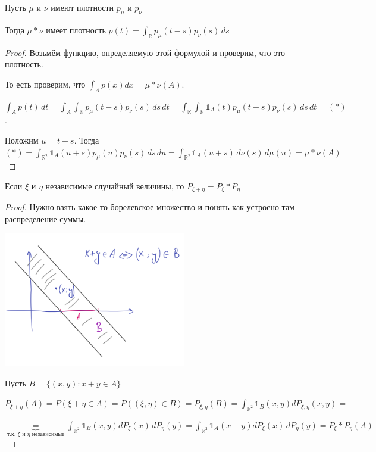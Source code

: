 \begin{theorem}
    Пусть $\mu$ и $\nu$ имеют плотности $p_{\mu}$ и $p_{\nu}$

    Тогда $\mu * \nu$ имеет плотность $p(t) = \int_{\mathbb{R}} p_{\mu} (t - s) p_{\nu} (s) \, ds$
\end{theorem}

\begin{proof}
    Возьмём функцию, определяемую этой формулой и проверим, что это плотность.

    То есть проверим, что $\int_{A} p(x) dx = \mu * \nu (A)$.

    $\int_A p(t) \, dt = \int_A \int_{\mathbb{R}} p_{\mu} (t - s) p_{\nu} (s) \, ds \, dt = \int_{\mathbb{R}}
    \int_{\mathbb{R}} \mathds{1}_A (t) p_{\mu} (t - s) p_{\nu} (s) \, ds \, dt = (*)$.

    Положим $u = t - s$. Тогда $(*) = \int_{\mathbb{R}^2} \mathds{1}_{A} (u + s) p_{\mu} (u) p_{\nu} (s) \, ds \, du =
    \int_{\mathbb{R}^2} \mathds{1}_A (u + s) \, d\nu (s) \, d \mu (u) = \mu * \nu (A)$
\end{proof}

\begin{theorem}
    Если $\xi$ и $\eta$ независимые случайный величины, то $P_{\xi + \eta} = P_{\xi} * P_{\eta}$
\end{theorem}

\begin{proof}
    Нужно взять какое-то борелевское множество и понять как устроено там распределение суммы.

    \begin{center}
        \includegraphics[width=8cm]{assets/02-general-prob-theory/new-set-B-x+y-in-A.PNG}
    \end{center}

    Пусть $B = \{ (x, y) : x + y \in A \}$

    $P_{\xi + \eta} (A) = P(\xi + \eta \in A) = P((\xi, \eta) \in B) = P_{\xi, \eta} (B) =\int_{\mathbb{R}^2} \mathds{1}_{B}(x, y) d P_{\xi, \eta}(x, y) =$

    $\underbrace{=}_{\text{т.к. $\xi$ и $\eta$ независимые}}
    \int_{\mathbb{R}^2} \mathds{1}_B (x, y) d P_{\xi} (x) \, dP_{\eta} (y) =
    \int_{\mathbb{R}^2} \mathds{1}_A (x + y) d P_{\xi} (x) \, dP_{\eta} (y) = P_{\xi} * P_{\eta} (A)$
\end{proof}

